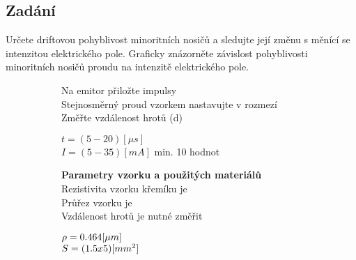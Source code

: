 \documentclass{article}
\begin{document}
\subsection*{Zadání}
Určete driftovou pohyblivost minoritních nosičů a sledujte její změnu s měnící se intenzitou elektrického pole.
Graficky znázorněte závislost pohyblivosti minoritních nosičů proudu na intenzitě elektrického pole.
\begin{figure}[H]
    \hspace{0.05\textwidth}
    \begin{minipage}[t]{0.9\textwidth}
        \begin{figure}[H]
            \begin{minipage}[t]{0.6\textwidth}
                Na emitor přiložte impulsy\\
                Stejnosměrný proud vzorkem nastavujte v rozmezí\\
                Změřte vzdálenost hrotů (d)\\
            \end{minipage}
            \hfill
            \begin{minipage}[t]{0.4\textwidth}
                \(t = (5 - 20) [\mu s] \)\\
                \(I = (5 - 35) [mA] \) min. 10 hodnot\\
            \end{minipage}
        \end{figure}
    \end{minipage}
    
    \hspace{0.05\textwidth}
    \begin{minipage}[t]{0.9\textwidth}
        \begin{figure}[H]
            \begin{minipage}[t]{0.6\textwidth}
                \textbf{ Parametry vzorku a použitých materiálů}\\
                Rezistivita vzorku křemíku je \\
                Průřez vzorku je\\
                Vzdálenost hrotů je nutné změřit\\
            \end{minipage}
            \hfill
            \begin{minipage}[t]{0.4\textwidth}
                \vspace{1.5mm}
                \(\rho = 0.464\-[\mu m]\)\\
                \(S = (1.5 x 5)\-[mm^2]\)\\
            \end{minipage}
        \end{figure}
    \end{minipage}
\end{figure}
\end{document}
